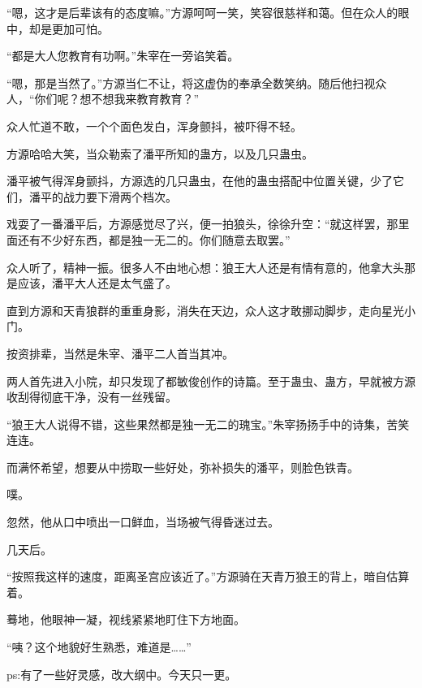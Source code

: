 \begin{this_body}
“嗯，这才是后辈该有的态度嘛。”方源呵呵一笑，笑容很慈祥和蔼。但在众人的眼中，却是更加可怕。

“都是大人您教育有功啊。”朱宰在一旁谄笑着。

“嗯，那是当然了。”方源当仁不让，将这虚伪的奉承全数笑纳。随后他扫视众人，“你们呢？想不想我来教育教育？”

众人忙道不敢，一个个面色发白，浑身颤抖，被吓得不轻。

方源哈哈大笑，当众勒索了潘平所知的蛊方，以及几只蛊虫。

潘平被气得浑身颤抖，方源选的几只蛊虫，在他的蛊虫搭配中位置关键，少了它们，潘平的战力要下滑两个档次。

戏耍了一番潘平后，方源感觉尽了兴，便一拍狼头，徐徐升空：“就这样罢，那里面还有不少好东西，都是独一无二的。你们随意去取罢。”

众人听了，精神一振。很多人不由地心想：狼王大人还是有情有意的，他拿大头那是应该，潘平大人还是太气盛了。

直到方源和天青狼群的重重身影，消失在天边，众人这才敢挪动脚步，走向星光小门。

按资排辈，当然是朱宰、潘平二人首当其冲。

两人首先进入小院，却只发现了都敏俊创作的诗篇。至于蛊虫、蛊方，早就被方源收刮得彻底干净，没有一丝残留。

“狼王大人说得不错，这些果然都是独一无二的瑰宝。”朱宰扬扬手中的诗集，苦笑连连。

而满怀希望，想要从中捞取一些好处，弥补损失的潘平，则脸色铁青。

噗。

忽然，他从口中喷出一口鲜血，当场被气得昏迷过去。

几天后。

“按照我这样的速度，距离圣宫应该近了。”方源骑在天青万狼王的背上，暗自估算着。

蓦地，他眼神一凝，视线紧紧地盯住下方地面。

“咦？这个地貌好生熟悉，难道是……”

ps:有了一些好灵感，改大纲中。今天只一更。

\end{this_body}

